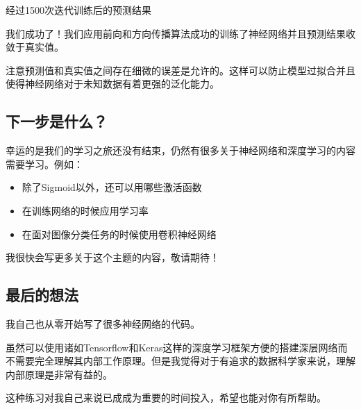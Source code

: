 经过1500次迭代训练后的预测结果

我们成功了！我们应用前向和方向传播算法成功的训练了神经网络并且预测结果收敛于真实值。

注意预测值和真实值之间存在细微的误差是允许的。这样可以防止模型过拟合并且使得神经网络对于未知数据有着更强的泛化能力。

\subsection{下一步是什么？}

幸运的是我们的学习之旅还没有结束，仍然有很多关于神经网络和深度学习的内容需要学习。例如：

\begin{itemize}
    \item 除了Sigmoid以外，还可以用哪些激活函数
    \item 在训练网络的时候应用学习率
    \item 在面对图像分类任务的时候使用卷积神经网络
\end{itemize}

我很快会写更多关于这个主题的内容，敬请期待！

\subsection{最后的想法}

我自己也从零开始写了很多神经网络的代码。

虽然可以使用诸如Tensorflow和Keras这样的深度学习框架方便的搭建深层网络而不需要完全理解其内部工作原理。但是我觉得对于有追求的数据科学家来说，理解内部原理是非常有益的。

这种练习对我自己来说已成成为重要的时间投入，希望也能对你有所帮助。